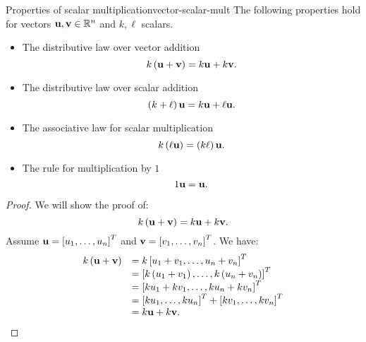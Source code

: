 \begin{theorem}{Properties of scalar multiplication}{vector-scalar-mult}
  The following properties hold for vectors
  $\mbox{\bf u},\mbox{\bf v}\in\mathbb{R}^{n}$ and $k,\ell$ scalars.%
  \begin{itemize}
  \item The distributive law over vector addition
    \begin{equation*}
      k \left(\mbox{\bf u}+\mbox{\bf v}\right) = k\mbox{\bf u} + k\mbox{\bf v}.
    \end{equation*}
  \item The distributive law over scalar addition
    \begin{equation*}
      \left(k + \ell\right) \mbox{\bf u} = k \mbox{\bf u} + \ell \mbox{\bf u}.
    \end{equation*}
  \item The associative law for scalar multiplication
    \begin{equation*}
      k \left(\ell \mbox{\bf u}\right) = \left(k \ell \right)\mbox{\bf u}.
    \end{equation*}
  \item The rule for multiplication by $1$
    \begin{equation*}
      1\mbox{\bf u}=\mbox{\bf u}.
    \end{equation*}
  \end{itemize}
\end{theorem}

\begin{proof}
We will show the proof of: 
\begin{equation*}
k \left(\mbox{\bf u}+\mbox{\bf v}\right) = k \mbox{\bf u}+ k \mbox{\bf v}.
\end{equation*}
Assume $\mbox{\bf u}=\left[u_{1},\ldots,u_{n}\right]^T$ and
$\mbox{\bf v}=\left[v_{1},\ldots,v_{n}\right]^T$. We have:
\begin{equation*}
\begin{array}{ll}
k \left(\mbox{\bf u}+\mbox{\bf v}\right) & =k \left[u_{1}+v_{1},\ldots,u_{n}+v_{n}\right]^T \\
& = \left[k \left(u_{1}+v_{1}\right), \ldots, k \left(u_{n}+v_{n}\right) \right]^T \\
& = \left[k u_{1}+ k  v_{1}, \ldots, k u_{n}+ k v_{n}\right]^T \\
& = \left[k u_{1}, \ldots, k u_{n} \right]^T + \left[k v_{1}, \ldots, k v_{n} \right]^T \\
& = k \mbox{\bf u}+k \mbox{\bf v}.
\end{array}
\end{equation*}
\end{proof}

